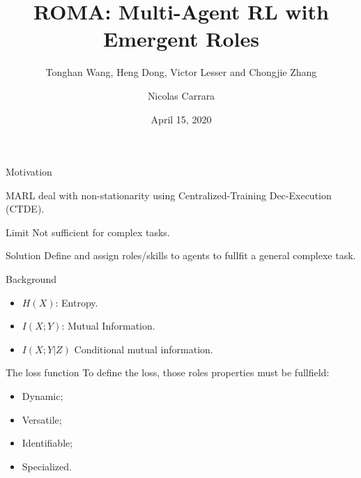 \documentclass{beamer}
\author[shortname]{Nicolas Carrara}
\institute[shortinst]{University of Toronto}
\title[ROMA]{ROMA: Multi-Agent RL with Emergent Roles}
\subtitle{Tonghan Wang, Heng Dong, Victor Lesser and Chongjie Zhang}
\date{April 15, 2020}
\begin{document}
    \begin{frame}
        \maketitle
        \centering
    \end{frame}

    \begin{frame}{Motivation}

        MARL deal with non-stationarity using Centralized-Training Dec-Execution (CTDE).

        \begin{alertblock}{Limit}
            Not sufficient for complex tasks.
        \end{alertblock}

        \begin{exampleblock}{Solution}
            Define and assign roles/skills to agents to fullfit a general complexe task.
            \end{exampleblock}

    \end{frame}

    \begin{frame}{Background}


        \begin{itemize}
            \item $H(X)$: Entropy.
            \item $I(X;Y)$: Mutual Information.
            \item $I(X;Y|Z)$ Conditional mutual information.

        \end{itemize}

    \end{frame}

    \begin{frame}{The loss function}
        To define the loss, those roles properties must be fullfield:

        \begin{itemize}
            \item Dynamic;
            \item Versatile;
            \item Identifiable;
            \item Specialized.
        \end{itemize}
    \end{frame}
\end{document}
